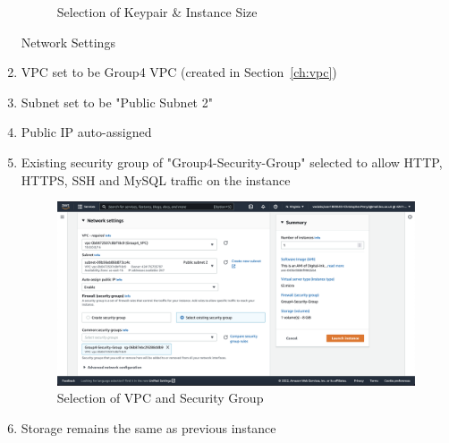 \begin{enumerate}
\begin{figure}[H]
	      \caption{Selection of Keypair \& Instance Size}
	      \label{fig:elb-type-and-keypair}
	\end{figure}
	Network Settings
	\item VPC set to be Group4 VPC  (created in Section~\ref{ch:vpc})
	\item Subnet set to be "Public Subnet 2"
	\item Public IP auto-assigned
	\item Existing security group of "Group4-Security-Group" selected to allow HTTP, HTTPS, SSH and MySQL traffic on the
	      instance \begin{figure}[H]
	      \centering
	      \includegraphics[width=\textwidth]{resources/elb/elb-instance-2-network-settings.png}
	      \caption{Selection of VPC and Security Group}
	      \label{fig:elb-instance-2-network-setting}
	\end{figure}
	\item Storage remains the same as previous instance


\end{enumerate}

